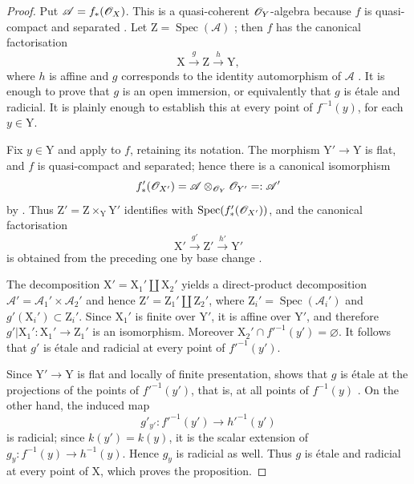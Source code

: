 \begin{proof}
Put $\mathscr{A}=f_*(\mathscr{O}_X)$. This is a quasi-coherent $\mathscr{O}_Y$-algebra because $f$ is quasi-compact and separated . Let $\mathrm{Z}=\operatorname{Spec}(\mathscr{A})$ ; then $f$ has the canonical factorisation
\[
  \mathrm{X}\xrightarrow{g}\mathrm{Z}\xrightarrow{h}\mathrm{Y},
\]
where $h$ is affine and $g$ corresponds to the identity automorphism of $\mathscr{A}$ . It is enough to prove that $g$ is an open immersion, or equivalently  that $g$ is \'etale and radicial. It is plainly enough to establish this at every point of $f^{-1}(y)$, for each $y\in\mathrm{Y}$.

Fix $y\in\mathrm{Y}$ and apply  to $f$, retaining its notation. The morphism $\mathrm{Y}'\to\mathrm{Y}$ is flat, and $f$ is quasi-compact and separated; hence there is a canonical isomorphism
\[
  f'_*(\mathscr{O}_{X'})
  =\mathscr{A}\otimes_{\mathscr{O}_Y}\mathscr{O}_{Y'}
  =:\mathscr{A}'
\]
by . Thus $\mathrm{Z}'=\mathrm{Z}\times_{\mathrm{Y}}\mathrm{Y}'$ identifies with $\operatorname{Spec}(f'_*(\mathscr{O}_{X'}))$, and the canonical factorisation
\[
  \mathrm{X}'\xrightarrow{g'}\mathrm{Z}'\xrightarrow{h'}\mathrm{Y}'
\]
is obtained from the preceding one by base change .

The decomposition $\mathrm{X}'=\mathrm{X}_1'\amalg\mathrm{X}_2'$ yields a direct-product decomposition $\mathscr{A}'=\mathscr{A}_1'\times\mathscr{A}_2'$ and hence $\mathrm{Z}'=\mathrm{Z}_1'\amalg\mathrm{Z}_2'$, where $\mathrm{Z}_i'=\operatorname{Spec}(\mathscr{A}_i')$ and $g'(\mathrm{X}_i')\subset\mathrm{Z}_i'$. Since $\mathrm{X}_1'$ is finite over $\mathrm{Y}'$, it is affine over $\mathrm{Y}'$, and therefore $g'|\mathrm{X}_1':\mathrm{X}_1'\to\mathrm{Z}_1'$ is an isomorphism. Moreover $\mathrm{X}_2'\cap f'^{-1}(y')=\varnothing$. It follows that $g'$ is \'etale and radicial at every point of $f'^{-1}(y')$.

Since $\mathrm{Y}'\to\mathrm{Y}$ is flat and locally of finite presentation,  shows that $g$ is \'etale at the projections of the points of $f'^{-1}(y')$, that is, at all points of $f^{-1}(y)$ . On the other hand, the induced map
\[
  g'_{y'}:f'^{-1}(y')\longrightarrow h'^{-1}(y')
\]
is radicial; since $k(y')=k(y)$, it is the scalar extension of $g_y:f^{-1}(y)\to h^{-1}(y)$. Hence $g_y$ is radicial as well. Thus $g$ is \'etale and radicial at every point of $\mathrm{X}$, which proves the proposition.
\end{proof}

